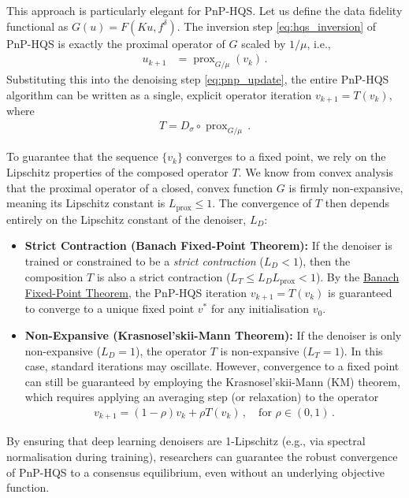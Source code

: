 This approach is particularly elegant for PnP-HQS. Let us define the data fidelity functional as $G(u) = F(Ku, f^\delta)$. The inversion step \eqref{eq:hqs_inversion} of PnP-HQS is exactly the proximal operator of $G$ scaled by $1/\mu$, i.e.,
\begin{align}
    u_{k+1} &= \operatorname{prox}_{G/\mu}(v_k) \, . \label{eq:hqs_prox_G}
\end{align}
Substituting this into the denoising step \eqref{eq:pnp_update}, the entire PnP-HQS algorithm can be written as a single, explicit operator iteration $v_{k+1} = T(v_k)$, where
\begin{align}
    T = D_\sigma \circ \operatorname{prox}_{G/\mu} \, .
    \label{eq:pnp_hqs_operator}
\end{align}

To guarantee that the sequence $\{v_k\}$ converges to a fixed point, we rely on the Lipschitz properties of the composed operator $T$. We know from convex analysis that the proximal operator of a closed, convex function $G$ is firmly non-expansive, meaning its Lipschitz constant is $L_{\text{prox}} \le 1$. The convergence of $T$ then depends entirely on the Lipschitz constant of the denoiser, $L_D$:
\begin{itemize}
    \item \textbf{Strict Contraction (Banach Fixed-Point Theorem):} If the denoiser is trained or constrained to be a \emph{strict contraction} ($L_D < 1$), then the composition $T$ is also a strict contraction ($L_T \le L_D L_{\text{prox}} < 1$). By the \href{https://en.wikipedia.org/wiki/Banach_fixed-point_theorem}{Banach Fixed-Point Theorem}, the PnP-HQS iteration $v_{k+1} = T(v_k)$ is guaranteed to converge to a unique fixed point $v^*$ for any initialisation $v_0$.
    \item \textbf{Non-Expansive (Krasnosel'skii-Mann Theorem):} If the denoiser is only non-expansive ($L_D = 1$), the operator $T$ is non-expansive ($L_T = 1$). In this case, standard iterations may oscillate. However, convergence to a fixed point can still be guaranteed by employing the Krasnosel'skii-Mann (KM) theorem, which requires applying an averaging step (or relaxation) to the operator
    \begin{align}
        v_{k+1} = (1 - \rho)v_k + \rho T(v_k) \, , \quad \text{for } \rho \in (0, 1) \, .
    \end{align}
\end{itemize}
By ensuring that deep learning denoisers are 1-Lipschitz (e.g., via spectral normalisation during training), researchers can guarantee the robust convergence of PnP-HQS to a consensus equilibrium, even without an underlying objective function.

